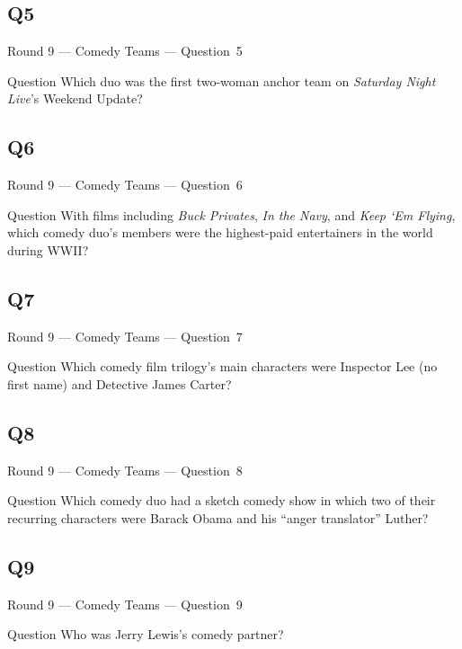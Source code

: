 \documentclass[11pt]{beamer}
\begin{document}
\subsection*{Q5}
\begin{frame}[t]{Round 9 --- Comedy Teams --- \mbox{Question 5}}
\vspace{-0.5em}
\begin{block}{Question}
Which duo was the first two-woman anchor team on \emph{Saturday Night Live}'s Weekend Update?
\end{block}
\end{frame}
\subsection*{Q6}
\begin{frame}[t]{Round 9 --- Comedy Teams --- \mbox{Question 6}}
\vspace{-0.5em}
\begin{block}{Question}
With films including \emph{Buck Privates}, \emph{In the Navy}, and \emph{Keep `Em Flying}, which comedy duo's members were the highest-paid entertainers in the world during WWII\@?
\end{block}
\end{frame}
\subsection*{Q7}
\begin{frame}[t]{Round 9 --- Comedy Teams --- \mbox{Question 7}}
\vspace{-0.5em}
\begin{block}{Question}
Which comedy film trilogy's main characters were Inspector Lee (no first name) and Detective James Carter?
\end{block}
\end{frame}
\subsection*{Q8}
\begin{frame}[t]{Round 9 --- Comedy Teams --- \mbox{Question 8}}
\vspace{-0.5em}
\begin{block}{Question}
Which comedy duo had a sketch comedy show in which two of their recurring characters were Barack Obama and his ``anger translator'' Luther?
\end{block}
\end{frame}
\subsection*{Q9}
\begin{frame}[t]{Round 9 --- Comedy Teams --- \mbox{Question 9}}
\vspace{-0.5em}
\begin{block}{Question}
Who was Jerry Lewis's comedy partner?
\end{block}
\end{frame}
\end{document}
